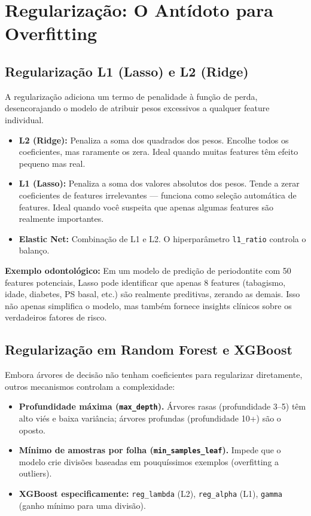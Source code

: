 \section{Regularização: O Antídoto para Overfitting}

\subsection{Regularização L1 (Lasso) e L2 (Ridge)}

A regularização  adiciona um termo de penalidade à função de perda, desencorajando o modelo de atribuir pesos excessivos a qualquer feature individual.

\begin{itemize}
    \item \textbf{L2 (Ridge):} Penaliza a soma dos quadrados dos pesos. Encolhe todos os coeficientes, mas raramente os zera. Ideal quando muitas features têm efeito pequeno mas real.
    \item \textbf{L1 (Lasso):} Penaliza a soma dos valores absolutos dos pesos. Tende a zerar coeficientes de features irrelevantes — funciona como seleção automática de features. Ideal quando você suspeita que apenas algumas features são realmente importantes.
    \item \textbf{Elastic Net:} Combinação de L1 e L2. O hiperparâmetro \texttt{l1\_ratio} controla o balanço.
\end{itemize}

\textbf{Exemplo odontológico:} Em um modelo de predição de periodontite com 50 features potenciais, Lasso pode identificar que apenas 8 features (tabagismo, idade, diabetes, PS basal, etc.) são realmente preditivas, zerando as demais. Isso não apenas simplifica o modelo, mas também fornece insights clínicos sobre os verdadeiros fatores de risco.

\subsection{Regularização em Random Forest e XGBoost}

Embora árvores de decisão não tenham coeficientes para regularizar diretamente, outros mecanismos controlam a complexidade:

\begin{itemize}
    \item \textbf{Profundidade máxima (\texttt{max\_depth}).} Árvores rasas (profundidade 3--5) têm alto viés e baixa variância; árvores profundas (profundidade 10+) são o oposto.
    \item \textbf{Mínimo de amostras por folha (\texttt{min\_samples\_leaf}).} Impede que o modelo crie divisões baseadas em pouquíssimos exemplos (overfitting a outliers).
    \item \textbf{XGBoost especificamente:} \texttt{reg\_lambda} (L2), \texttt{reg\_alpha} (L1), \texttt{gamma} (ganho mínimo para uma divisão).
\end{itemize}

